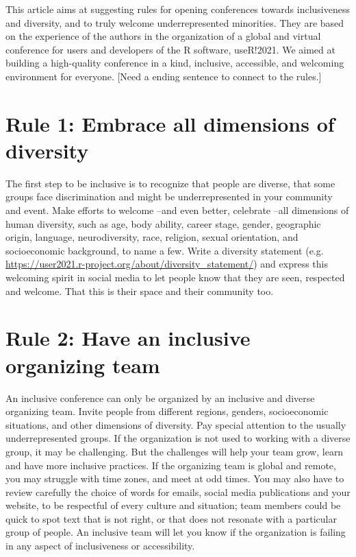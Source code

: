\documentclass[10pt,letterpaper]{article}
\begin{document}
This article aims at suggesting rules for opening conferences towards inclusiveness and diversity, and to truly welcome underrepresented minorities. They are based on the experience of the authors in the organization of a global and virtual conference for users and developers of the R software, useR!2021. We aimed at building a high-quality conference in a kind, inclusive, accessible, and welcoming environment for everyone. [Need a ending sentence to connect to the rules.]

\section*{Rule 1: Embrace all dimensions of diversity}
The first step to be inclusive is to recognize that people are diverse, that some groups face discrimination and might be underrepresented in your community and event. Make efforts to welcome --and even better, celebrate --all dimensions of human diversity, such as age, body ability, career stage, gender, geographic origin, language, neurodiversity, race, religion, sexual orientation, and socioeconomic background, to name a few. Write a diversity statement (e.g. \url{https://user2021.r-project.org/about/diversity_statement/}) and express this welcoming spirit in social media to let people know that they are seen, respected and welcome. That this is their space and their community too. 

\section*{Rule 2: Have an inclusive organizing team}
An inclusive conference can only be organized by an inclusive and diverse organizing team. Invite people from different regions, genders, socioeconomic situations, and other dimensions of diversity. Pay special attention to the usually underrepresented groups. If the organization is not used to working with a diverse group, it may be challenging. But the challenges will help your team grow, learn and have more inclusive practices. If the organizing team is global and remote, you may struggle with time zones, and meet at odd times. You may also have to review carefully the choice of words for emails,
social media publications and your website, to be respectful of every culture and situation;
team members could be quick to spot text that is not right, or that does not resonate with a particular group of people. An inclusive team will let you know if the organization is failing in any aspect of inclusiveness or accessibility.
\end{document}
